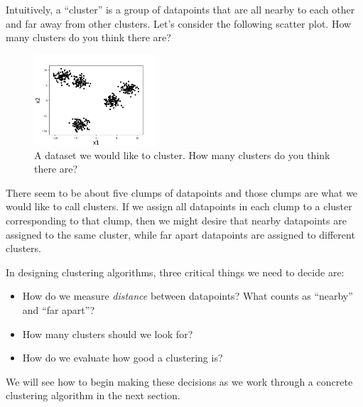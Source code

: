 
Intuitively, a ``cluster'' is a group of datapoints that are all
nearby to each other and far away from other clusters. Let's consider
the following scatter plot. How many clusters do you think there are?

\begin{figure}[h]
  \centering
  \includegraphics[width=0.40\textwidth]{figures/kmeans_fig1.png}
  \caption{A dataset we would like to cluster. How many clusters do you think there are?}
  \label{fig:kmeans_fig1}
\end{figure}

There seem to be about five clumps of datapoints and those clumps are
what we would like to call clusters. If we assign all datapoints in
each clump to a cluster corresponding to that clump, then we might
desire that nearby datapoints are assigned to the same cluster, while
far apart datapoints are assigned to different clusters.

In designing clustering algorithms, three critical things we need to decide are:
\begin{itemize}
  \item How do we measure \textit{distance} between datapoints? What counts as ``nearby'' and ``far apart''?
  \item How many clusters should we look for?
  \item How do we evaluate how good a clustering is?
\end{itemize}

We will see how to begin making these decisions as we work through a
concrete clustering algorithm in the next section.

